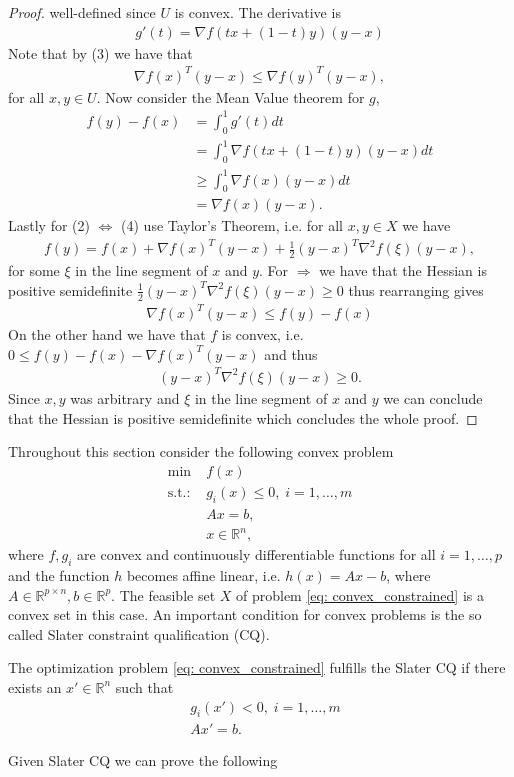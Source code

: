 \begin{proof}
well-defined since $U$ is convex. The derivative is
\begin{align}
    g'(t) = \nabla f(t x + (1-t) y) (y-x)
\end{align}
Note that by (3) we have that
\begin{align}
    \nabla f(x)^{T} (y-x) \le \nabla f(y)^{T} (y-x),
\end{align}
for all $x, y \in U$. Now consider the Mean Value theorem for $g$,
\begin{align}
    f(y) - f(x) &= \int_0^1 g'(t) dt\\
                &= \int_0^1 \nabla f(tx +(1-t)y)(y-x)dt\\
                &\ge \int_0^1 \nabla f(x)(y-x) dt\\
                &= \nabla f(x) (y-x).
\end{align}
Lastly for (2) $\Leftrightarrow$ (4) use Taylor's Theorem, i.e. for all $x, y
\in X$ we have
\begin{align}
    f(y) = f(x) + \nabla f(x)^{T} (y-x) + \frac{1}{2}(y-x)^{T} \nabla^2
    f(\xi)(y-x),
\end{align}
for some $\xi$ in the line segment of $x$ and $y$. For $\Rightarrow$ we have
that the Hessian is positive semidefinite $\frac{1}{2}(y-x)^{T} \nabla^2 f(\xi)(y-x) \ge 0$
thus rearranging gives
\begin{align}
    \nabla f(x)^{T} (y-x) \le f(y) - f(x)
\end{align}
On the other hand we have that $f$ is convex, i.e. $0 \le f(y)-f(x)- \nabla
f(x)^{T} (y-x) $ and thus
\begin{align}
    (y-x)^{T} \nabla^2 f(\xi)(y-x) \ge 0.
\end{align}
Since $x, y$ was arbitrary and $\xi$ in the line segment of $x$ and $y$ we
can conclude that the Hessian is positive semidefinite which concludes the
whole proof.
\end{proof}
Throughout this section consider the following convex problem
\begin{align}
    \min\;&f(x) \label{eq: convex_constrained}\\
    \text{s.t.:}\;&g_i(x) \le 0,\; i=1,\ldots,m \nonumber\\
        &Ax = b,\; \nonumber\\
        &x \in \mathbb{R}^{n}\nonumber,
\end{align}
where $f, g_i$ are convex and continuously differentiable functions for all
$i=1,\ldots,p$ and the function $h$ becomes affine linear, i.e. $h(x) =
Ax-b$, where $A \in \mathbb{R}^{p\times n}, b\in \mathbb{R}^{p}$. The
feasible set $X$ of problem \ref{eq: convex_constrained} is a convex set in
this case. An important condition for convex problems is the so called Slater
constraint qualification (CQ).
\begin{definition}
    The optimization problem \ref{eq: convex_constrained} fulfills the Slater
    CQ if there exists an $x' \in \mathbb{R}^{n}$ such that
    \begin{align}
        &g_i(x') < 0,\; i=1,\ldots,m \\
        &Ax' = b.
    \end{align}
\end{definition}
Given Slater CQ we can prove the following

